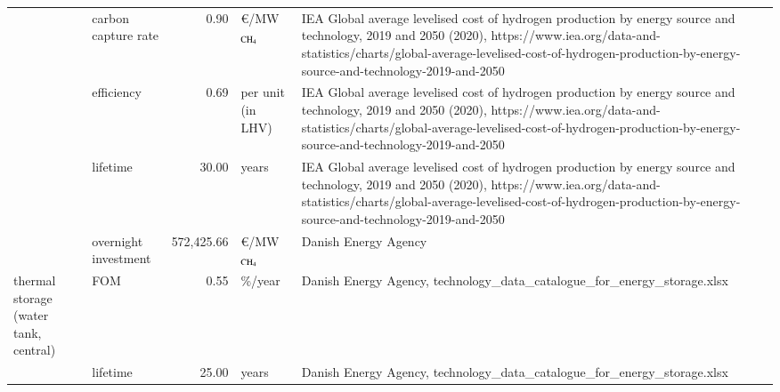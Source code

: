 \begin{longtable}{p{4cm}p{4cm}rp{3cm}p{10cm}}
                      & carbon capture rate &         0.90 &         \euro/MW$_{\ce{CH4}}$ &                                                                    IEA Global average levelised cost of hydrogen production by energy source and technology, 2019 and 2050 (2020), https://www.iea.org/data-and-statistics/charts/global-average-levelised-cost-of-hydrogen-production-by-energy-source-and-technology-2019-and-2050 \\
                      & efficiency &         0.69 &             per unit (in LHV) &                                                                    IEA Global average levelised cost of hydrogen production by energy source and technology, 2019 and 2050 (2020), https://www.iea.org/data-and-statistics/charts/global-average-levelised-cost-of-hydrogen-production-by-energy-source-and-technology-2019-and-2050 \\
                      & lifetime &        30.00 &                         years &                                                                    IEA Global average levelised cost of hydrogen production by energy source and technology, 2019 and 2050 (2020), https://www.iea.org/data-and-statistics/charts/global-average-levelised-cost-of-hydrogen-production-by-energy-source-and-technology-2019-and-2050 \\
                      & overnight investment &   572,425.66 &         \euro/MW$_{\ce{CH4}}$ &                                                                                                                                                                                                                                                                                                                 Danish Energy Agency \\
thermal storage (water tank, central) & FOM &         0.55 &                       \%/year &                                                                                                                                                                                                                                                         Danish Energy Agency, technology\_data\_catalogue\_for\_energy\_storage.xlsx \\
                      & lifetime &        25.00 &                         years &                                                                                                                                                                                                                                                         Danish Energy Agency, technology\_data\_catalogue\_for\_energy\_storage.xlsx \\

\end{longtable}
